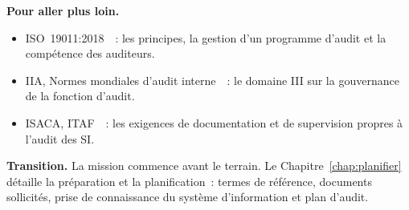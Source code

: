 \begin{boxinfo}
\textbf{Pour aller plus loin.}
\begin{itemize}
    \item ISO~19011:2018~\cite{iso19011_2018}~: les principes, la gestion
          d'un programme d'audit et la compétence des auditeurs.
    \item IIA, Normes mondiales d'audit interne~\cite{iia2024gias}~: le
          domaine III sur la gouvernance de la fonction d'audit.
    \item ISACA, ITAF~\cite{isaca2020itaf}~: les exigences de
          documentation et de supervision propres à l'audit des SI.
\end{itemize}
\end{boxinfo}

\begin{boxinfo}
\textbf{Transition.} La mission commence avant le terrain. Le
Chapitre~\ref{chap:planifier} détaille la préparation et la planification~:
termes de référence, documents sollicités, prise de connaissance du système
d'information et plan d'audit.
\end{boxinfo}
